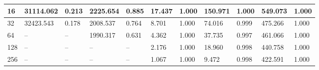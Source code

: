 \begin{table}[!t]
\begin{center}
\begin{small}
\begin{sc}
\begin{tabular}{|l|p{1cm}|p{1cm}|p{1cm}|p{1cm}|p{1cm}|p{1cm}|p{1cm}|p{1cm}|p{1cm}|p{1cm}|}
                    \hline
                    16 & 31114.062 & 0.213 & 2225.654 & 0.885 & 17.437 & 1.000 & 150.971 & 1.000 & 549.073 & 1.000 \\
                    \hline
                    32 & 32423.543 & 0.178 & 2008.537 & 0.764 & 8.701 & 1.000 & 74.016 & 0.999 & 475.266 & 1.000 \\
                    \hline
                    64 & -- & -- & 1990.317 & 0.631 & 4.362 & 1.000 & 37.735 & 0.997 & 461.066 & 1.000 \\
                    \hline
                    128 & -- & -- & -- & -- & 2.176 & 1.000 & 18.960 & 0.998 & 440.758 & 1.000 \\
                    \hline
                    256 & -- & -- & -- & -- & 1.067 & 1.000 & 9.472 & 0.998 & 422.591 & 1.000 \\
                    \hline
                \end{tabular}
            \end{sc}
        \end{small}
    \end{center}
    \vskip -0.1in
\end{table}

